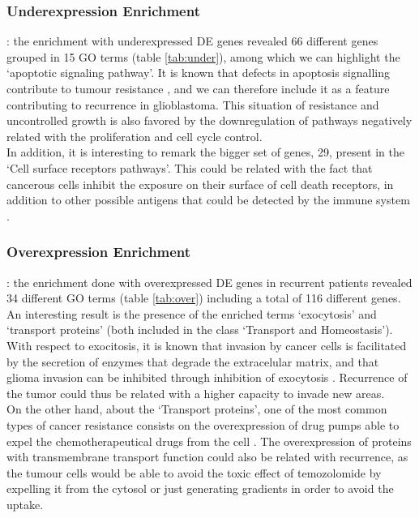 \documentclass[9pt,twocolumn,twoside]{gsajnl}
\begin{document}
\subsubsection*{Underexpression Enrichment}: the enrichment with underexpressed DE genes revealed 66 different genes grouped in 15 GO terms (table \ref{tab:under}), among which we can highlight the `apoptotic signaling pathway'. It is known that defects in apoptosis signalling contribute to tumour resistance \citep{Debatin2004}, and we can therefore include it as a feature contributing to recurrence in glioblastoma. This situation of resistance and uncontrolled growth is also favored by the downregulation of pathways negatively related with the proliferation and cell cycle control.\\
In addition, it is interesting to remark the bigger set of genes, 29, present in the `Cell surface receptors pathways'. This could be related with the fact that cancerous cells inhibit the exposure on their surface of cell death receptors, in addition to other possible antigens that could be detected by the immune system \citep{Ozoren2003}.

\subsubsection*{Overexpression Enrichment}: the enrichment done with overexpressed DE genes in recurrent patients revealed 34 different GO terms (table \ref{tab:over}) including a total of 116 different genes. An interesting result is the presence of the enriched terms `exocytosis' and `transport proteins' (both included in the class `Transport and Homeostasis').\\
With respect to exocitosis, it is known that invasion by cancer cells is facilitated by the secretion of enzymes that degrade the extracelular matrix, and that glioma invasion can be inhibited through inhibition of exocytosis \citep{Liu2012}. Recurrence of the tumor could thus be related with a higher capacity to invade new areas.\\
On the other hand, about the `Transport proteins', one of the most common types of cancer resistance consists on the overexpression of drug pumps able to expel the chemotherapeutical drugs from the cell \citep{Borst2012}. The overexpression of proteins with transmembrane transport function could also be related with recurrence, as the tumour cells would be able to avoid the toxic effect of temozolomide by expelling it from the cytosol or just generating gradients in order to avoid the uptake.
\end{document}
